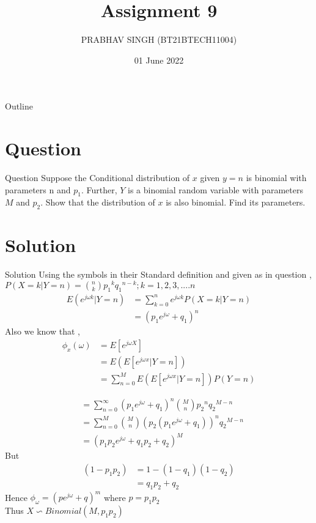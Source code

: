 \documentclass{beamer}
\title{Assignment 9}
\author{PRABHAV SINGH (BT21BTECH11004)}
\date{01 June 2022}
\begin{document}
	
	\begin{frame}
		\titlepage 
	\end{frame}
	
	\logo{}
	
	
	\begin{frame}{Outline}
		\tableofcontents
	\end{frame}
	
	\section{Question}
	\begin{frame}{Question}
	Suppose the Conditional distribution of $ x $ given $ y = n $ is binomial with parameters n and 
	$ p_{1} $. Further, $  Y $ is a binomial random variable with parameters $  M $ and $ p_{2} $. Show that the 
	distribution of $  x  $ is also binomial. Find its parameters.  \\
	\end{frame}
	
	
	\section{Solution}
	\begin{frame}{Solution}
	Using the symbols in their Standard  definition and given as in question ,
	$ 	P(X=k|Y=n) =\binom{n}{k}{p_{1}}^{k}{q_{1}}^{n-k}; k=1,2,3,....n $  \\
	\begin{align}
		E(e^{j{\omega}k}|Y=n)&=\sum_{k=0}^{n}e^{j{\omega}k}P(X=k|Y=n)\\
		&={(p_{1}e^{j{\omega}}+q_{1})}^{n}
	\end{align}
Also we know that ,
\begin{align}
	{\phi}_{x}({\omega})&=E[e^{j{\omega}X}]\\
	&=E(E[e^{j{\omega}x}|Y=n])\\
	&=\sum_{n=0}^{M}E(E[e^{j{\omega}x}|Y=n])P(Y=n)
	\end{align}
\end{frame} 
	
	\begin{frame}
		\begin{align}
			&=\sum_{n=0}^{{\infty}}{(p_{1}e^{j{\omega}}+q_{1})}^{n}\binom{M}{n}{p_{2}}^{n}{q_{2}}^{M-n}\\
			&=\sum_{n=0}^{M}\binom{M}{n}{(p_{2}(p_{1}e^{j{\omega}}+q_{1}))}^{n}{q_{2}}^{M-n}\\
			&= {(p_{1}p_{2}e^{j{\omega}}+q_{1}p_{2}+q_{2})}^{M}
		\end{align}
	But 
	\begin{align}
		(1-p_{1}p_{2} )&= 1- (1-q_{1})(1-q_{2})\\
		&= q_{1}p_{2}+q_{2}
	\end{align}
	Hence 
	{ \textbf{$ {\phi}_{{\omega}}={(pe^{j{\omega}}+q)}^{m} $}} where $ p=p_{1}p_{2} $ \\
	Thus $ \boxed{X \backsim Binomial(M,p_{1}p_{2})} $
\end{frame}
\end{document}
